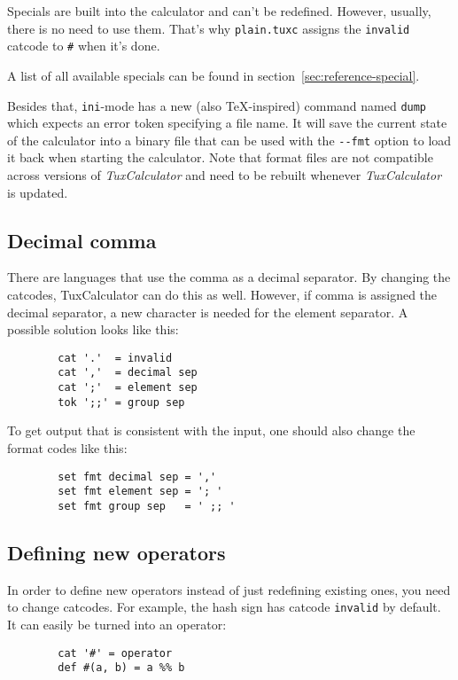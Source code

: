\documentclass[10pt]{article}
\begin{document}
    Specials are built into the calculator and can't be redefined.
    However, usually, there is no need to use them.
    That's why \verb|plain.tuxc| assigns the \verb|invalid| catcode to \verb|#| when it's done.
    
    A list of all available specials can be found in section~\ref{sec:reference-special}.
    
    Besides that, \verb|ini|-mode has a new (also \TeX-inspired) command named \verb|dump| which expects an error token specifying a file name.
    It will save the current state of the calculator into a binary file that can be used with the \verb|--fmt| option to load it back when starting the calculator.
    Note that format files are not compatible across versions of \textit{TuxCalculator} and need to be rebuilt whenever \textit{TuxCalculator} is updated.
    
    \subsection{Decimal comma}\label{subsec:decimal-comma}
    There are languages that use the comma as a decimal separator.
    By changing the catcodes, TuxCalculator can do this as well.
    However, if comma is assigned the decimal separator, a new character is needed for the element separator.
    A possible solution looks like this:
    \begin{verbatim}
        cat '.'  = invalid
        cat ','  = decimal sep
        cat ';'  = element sep
        tok ';;' = group sep
    \end{verbatim}
    To get output that is consistent with the input, one should also change the format codes like this:
    \begin{verbatim}
        set fmt decimal sep = ','
        set fmt element sep = '; '
        set fmt group sep   = ' ;; '
    \end{verbatim}
    
    \subsection{Defining new operators}\label{subsec:new-operators}
    In order to define new operators instead of just redefining existing ones, you need to change catcodes.
    For example, the hash sign has catcode \verb|invalid| by default.
    It can easily be turned into an operator:
    \begin{verbatim}
        cat '#' = operator
        def #(a, b) = a %% b
    \end{verbatim}
\end{document}
